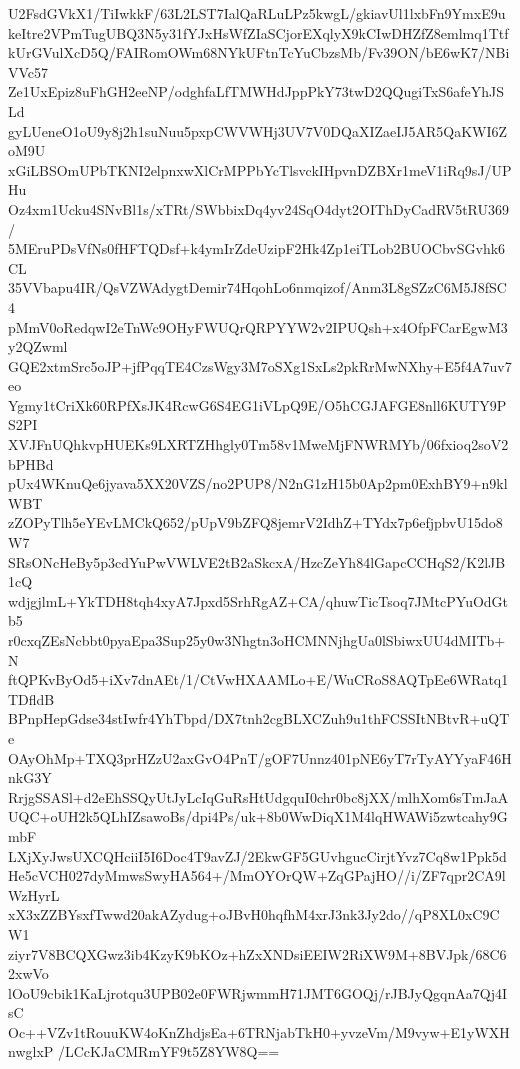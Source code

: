 U2FsdGVkX1/TiIwkkF/63L2LST7IalQaRLuLPz5kwgL/gkiavUl1lxbFn9YmxE9u
keItre2VPmTugUBQ3N5y31fYJxHsWfZIaSCjorEXqlyX9kCIwDHZfZ8emlmq1Ttf
kUrGVulXcD5Q/FAIRomOWm68NYkUFtnTcYuCbzsMb/Fv39ON/bE6wK7/NBiVVc57
Ze1UxEpiz8uFhGH2eeNP/odghfaLfTMWHdJppPkY73twD2QQugiTxS6afeYhJSLd
gyLUeneO1oU9y8j2h1suNuu5pxpCWVWHj3UV7V0DQaXIZaeIJ5AR5QaKWI6ZoM9U
xGiLBSOmUPbTKNI2elpnxwXlCrMPPbYcTlsvckIHpvnDZBXr1meV1iRq9sJ/UPHu
Oz4xm1Ucku4SNvBl1s/xTRt/SWbbixDq4yv24SqO4dyt2OIThDyCadRV5tRU369/
5MEruPDsVfNs0fHFTQDsf+k4ymIrZdeUzipF2Hk4Zp1eiTLob2BUOCbvSGvhk6CL
35VVbapu4IR/QsVZWAdygtDemir74HqohLo6nmqizof/Anm3L8gSZzC6M5J8fSC4
pMmV0oRedqwI2eTnWc9OHyFWUQrQRPYYW2v2IPUQsh+x4OfpFCarEgwM3y2QZwml
GQE2xtmSrc5oJP+jfPqqTE4CzsWgy3M7oSXg1SxLs2pkRrMwNXhy+E5f4A7uv7eo
Ygmy1tCriXk60RPfXsJK4RcwG6S4EG1iVLpQ9E/O5hCGJAFGE8nll6KUTY9PS2PI
XVJFnUQhkvpHUEKs9LXRTZHhgly0Tm58v1MweMjFNWRMYb/06fxioq2soV2bPHBd
pUx4WKnuQe6jyava5XX20VZS/no2PUP8/N2nG1zH15b0Ap2pm0ExhBY9+n9klWBT
zZOPyTlh5eYEvLMCkQ652/pUpV9bZFQ8jemrV2IdhZ+TYdx7p6efjpbvU15do8W7
SRsONcHeBy5p3cdYuPwVWLVE2tB2aSkcxA/HzcZeYh84lGapcCCHqS2/K2lJB1cQ
wdjgjlmL+YkTDH8tqh4xyA7Jpxd5SrhRgAZ+CA/qhuwTicTsoq7JMtcPYuOdGtb5
r0cxqZEsNcbbt0pyaEpa3Sup25y0w3Nhgtn3oHCMNNjhgUa0lSbiwxUU4dMITb+N
ftQPKvByOd5+iXv7dnAEt/1/CtVwHXAAMLo+E/WuCRoS8AQTpEe6WRatq1TDfldB
BPnpHepGdse34stIwfr4YhTbpd/DX7tnh2cgBLXCZuh9u1thFCSSItNBtvR+uQTe
OAyOhMp+TXQ3prHZzU2axGvO4PnT/gOF7Unnz401pNE6yT7rTyAYYyaF46HnkG3Y
RrjgSSASl+d2eEhSSQyUtJyLcIqGuRsHtUdgquI0chr0bc8jXX/mlhXom6sTmJaA
UQC+oUH2k5QLhIZsawoBs/dpi4Ps/uk+8b0WwDiqX1M4lqHWAWi5zwtcahy9GmbF
LXjXyJwsUXCQHciiI5I6Doc4T9avZJ/2EkwGF5GUvhgucCirjtYvz7Cq8w1Ppk5d
He5cVCH027dyMmwsSwyHA564+/MmOYOrQW+ZqGPajHO//i/ZF7qpr2CA9lWzHyrL
xX3xZZBYsxfTwwd20akAZydug+oJBvH0hqfhM4xrJ3nk3Jy2do//qP8XL0xC9CW1
ziyr7V8BCQXGwz3ib4KzyK9bKOz+hZxXNDsiEEIW2RiXW9M+8BVJpk/68C62xwVo
lOoU9cbik1KaLjrotqu3UPB02e0FWRjwmmH71JMT6GOQj/rJBJyQgqnAa7Qj4IsC
Oc++VZv1tRouuKW4oKnZhdjsEa+6TRNjabTkH0+yvzeVm/M9vyw+E1yWXHnwglxP
/LCcKJaCMRmYF9t5Z8YW8Q==
